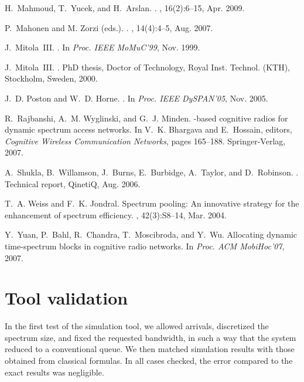 \documentclass{amsart}
\begin{document}
\begin{thebibliography}{10}
H.~Mahmoud, T.~Yucek, and H.~Arslan.
.
, 16(2):6--15, Apr. 2009.

P.~Mahonen and {M. Zorzi (eds.)}.
.
, 14(4):4--5, Aug.
  2007.

J.~Mitola~III.
.
\newblock In {\em {Proc. IEEE MoMuC'99}}, Nov. 1999.

J.~Mitola~III.
.
\newblock PhD thesis, Doctor of Technology, Royal Inst. Technol. (KTH),
  Stockholm, Sweden, 2000.

J.~D. Poston and W.~D. Horne.
.
\newblock In {\em Proc. IEEE DySPAN'05}, Nov. 2005.

R.~Rajbanshi, A.~M. Wyglinski, and G.~J. Minden.
-based cognitive radios for dynamic spectrum access networks.
\newblock In V.~K. Bhargava and E.~Hossain, editors, {\em Cognitive Wireless
  Communication Networks}, pages 165--188. Springer-Verlag, 2007.

A.~Shukla, B.~Willamson, J.~Burns, E.~Burbidge, A.~Taylor, and D.~Robinson.
.
\newblock Technical report, QinetiQ, Aug. 2006.

T.~A. Weiss and F.~K. Jondral.
\newblock Spectrum pooling: An innovative strategy for the enhancement of
  spectrum efficiency.
, 42(3):S8--14, Mar. 2004.

Y.~Yuan, P.~Bahl, R.~Chandra, T.~Moscibroda, and Y.~Wu.
\newblock Allocating dynamic time-spectrum blocks in cognitive radio networks.
\newblock In {\em Proc. ACM MobiHoc'07}, 2007.

\end{thebibliography}

\normalsize

\clearpage

\appendix


\section{Tool validation}
\label{app:validation}
In the first test of the simulation tool, we allowed arrivals, discretized
the spectrum size, and fixed the requested bandwidth, in such a way that
the system reduced to a conventional  queue.  We then
matched simulation results with those obtained from classical formulas.
In all cases checked, the error compared to the exact results was negligible.
\end{document}
